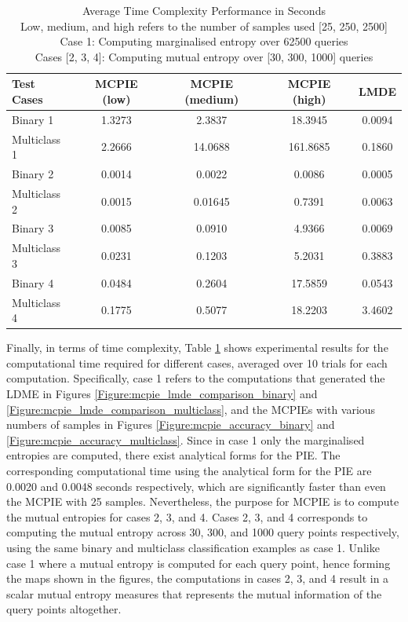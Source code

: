 		\begin{table}[t]
			\begin{center}
				\begin{tabular}{ l c c c c }
					\hline
					\hline
					Test Cases & MCPIE (low) & MCPIE (medium) & MCPIE (high) & LMDE \\
					\hline
					\hline
					Binary 1 & 1.3273 & 2.3837 & 18.3945 & 0.0094 \\
					Multiclass 1 & 2.2666 & 14.0688 & 161.8685 & 0.1860 \\
					Binary 2 & 0.0014 & 0.0022 & 0.0086 & 0.0005 \\
					Multiclass 2 & 0.0015 & 0.01645 & 0.7391 & 0.0063 \\
					Binary 3 & 0.0085 & 0.0910 & 4.9366 & 0.0069 \\
					Multiclass 3 & 0.0231 & 0.1203 & 5.2031 & 0.3883 \\
					Binary 4 & 0.0484 & 0.2604 & 17.5859 & 0.0543 \\
					Multiclass 4 & 0.1775 & 0.5077 & 18.2203 & 3.4602 \\
					\hline
					\hline
				\end{tabular}
			\end{center}
	  	\caption{Average Time Complexity Performance in Seconds \\ Low, medium, and high refers to the number of samples used [25, 250, 2500] \\ Case 1: Computing marginalised entropy over 62500 queries \\ Cases [2, 3, 4]: Computing mutual entropy over [30, 300, 1000] queries}
	  	\label{Table:TimeComplexity}			
	  	\end{table}	
	  	
		Finally, in terms of time complexity, Table \ref{Table:TimeComplexity} shows experimental results for the computational time required for different cases, averaged over 10 trials for each computation. Specifically, case 1 refers to the computations that generated the LDME in Figures \ref{Figure:mcpie_lmde_comparison_binary} and \ref{Figure:mcpie_lmde_comparison_multiclass}, and the MCPIEs with various numbers of samples in Figures \ref{Figure:mcpie_accuracy_binary} and \ref{Figure:mcpie_accuracy_multiclass}. Since in case 1 only the marginalised entropies are computed, there exist analytical forms for the PIE. The corresponding computational time using the analytical form for the PIE are 0.0020 and 0.0048 seconds respectively, which are significantly faster than even the MCPIE with 25 samples. Nevertheless, the purpose for MCPIE is to compute the mutual entropies for cases 2, 3, and 4. Cases 2, 3, and 4 corresponds to computing the mutual entropy across 30, 300, and 1000 query points respectively, using the same binary and multiclass classification examples as case 1. Unlike case 1 where a mutual entropy is computed for each query point, hence forming the maps shown in the figures, the computations in cases 2, 3, and 4 result in a scalar mutual entropy measures that represents the mutual information of the query points altogether.
		
